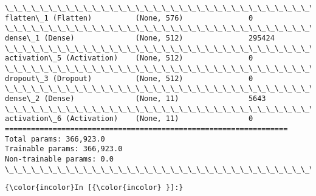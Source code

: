 \documentclass[11pt]{article}
\begin{document}
\begin{Verbatim}[commandchars=\\\{\}]
\_\_\_\_\_\_\_\_\_\_\_\_\_\_\_\_\_\_\_\_\_\_\_\_\_\_\_\_\_\_\_\_\_\_\_\_\_\_\_\_\_\_\_\_\_\_\_\_\_\_\_\_\_\_\_\_\_\_\_\_\_\_\_\_\_
flatten\_1 (Flatten)          (None, 576)               0         
\_\_\_\_\_\_\_\_\_\_\_\_\_\_\_\_\_\_\_\_\_\_\_\_\_\_\_\_\_\_\_\_\_\_\_\_\_\_\_\_\_\_\_\_\_\_\_\_\_\_\_\_\_\_\_\_\_\_\_\_\_\_\_\_\_
dense\_1 (Dense)              (None, 512)               295424    
\_\_\_\_\_\_\_\_\_\_\_\_\_\_\_\_\_\_\_\_\_\_\_\_\_\_\_\_\_\_\_\_\_\_\_\_\_\_\_\_\_\_\_\_\_\_\_\_\_\_\_\_\_\_\_\_\_\_\_\_\_\_\_\_\_
activation\_5 (Activation)    (None, 512)               0         
\_\_\_\_\_\_\_\_\_\_\_\_\_\_\_\_\_\_\_\_\_\_\_\_\_\_\_\_\_\_\_\_\_\_\_\_\_\_\_\_\_\_\_\_\_\_\_\_\_\_\_\_\_\_\_\_\_\_\_\_\_\_\_\_\_
dropout\_3 (Dropout)          (None, 512)               0         
\_\_\_\_\_\_\_\_\_\_\_\_\_\_\_\_\_\_\_\_\_\_\_\_\_\_\_\_\_\_\_\_\_\_\_\_\_\_\_\_\_\_\_\_\_\_\_\_\_\_\_\_\_\_\_\_\_\_\_\_\_\_\_\_\_
dense\_2 (Dense)              (None, 11)                5643      
\_\_\_\_\_\_\_\_\_\_\_\_\_\_\_\_\_\_\_\_\_\_\_\_\_\_\_\_\_\_\_\_\_\_\_\_\_\_\_\_\_\_\_\_\_\_\_\_\_\_\_\_\_\_\_\_\_\_\_\_\_\_\_\_\_
activation\_6 (Activation)    (None, 11)                0         
=================================================================
Total params: 366,923.0
Trainable params: 366,923.0
Non-trainable params: 0.0
\_\_\_\_\_\_\_\_\_\_\_\_\_\_\_\_\_\_\_\_\_\_\_\_\_\_\_\_\_\_\_\_\_\_\_\_\_\_\_\_\_\_\_\_\_\_\_\_\_\_\_\_\_\_\_\_\_\_\_\_\_\_\_\_\_

    \end{Verbatim}

    \begin{Verbatim}[commandchars=\\\{\}]
{\color{incolor}In [{\color{incolor} }]:} 
\end{Verbatim}


    
    
    
    
\end{document}
